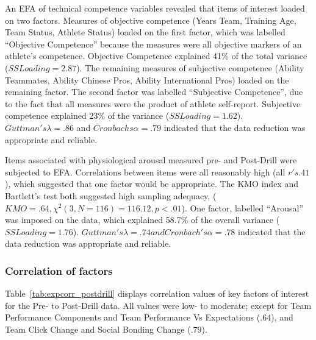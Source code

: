 \begin{CJK}{UTF8}{gbsn}
An EFA of technical competence variables revealed that items of interest loaded on two factors. Measures of objective competence (Years Team, Training Age, Team Status, Athlete Status) loaded on the first factor, which was labelled ``Objective Competence'' because the measures were all objective markers of an athlete's competence.
Objective Competence explained 41\% of the total variance ($SS Loading = 2.87$).  The remaining measures of subjective competence (Ability Teammates, Ability Chinese Pros, Ability International Pros) loaded on the remaining factor.  The second factor was labelled ``Subjective Competence'', due to the fact that all measures were the product of athlete self-report.  Subjective competence explained 23\% of the variance ($SS Loading = 1.62$).  $Guttman's \lambda = .86$ and $Cronbachs \alpha = .79$ indicated that the data reduction was appropriate and reliable.

Items associated with physiological arousal measured pre- and Post-Drill were subjected to EFA.
Correlations between items were all reasonably high (all $r's  .41$), which suggested that one factor would be appropriate. The KMO index and Bartlett's test both suggested high sampling adequacy, ($KMO = .64, \chi^2(3, N = 116) = 116.12, p < .01$).  One factor, labelled ``Arousal'' was imposed on the data, which explained 58.7\% of the overall variance ($SS Loading = 1.76$).  $Guttman's \lambda = .74 and  Cronbach's \alpha = .78$  indicated that the data reduction was appropriate and reliable.






\subsubsection{Correlation of factors}
Table~\ref{tab:expcorr_postdrill} displays correlation values of key factors of interest for the Pre- to Post-Drill data.  All values were low- to moderate; except for Team Performance Components and Team Performance Vs Expectations ($.64$), and Team Click Change and Social Bonding Change ($.79$).



\end{CJK}
